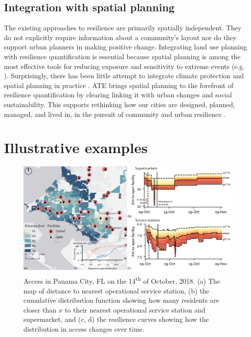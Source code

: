 \documentclass[9pt,twocolumn,twoside,lineno]{pnas-new}
\begin{document}
\subsection*{Integration with spatial planning}
The existing approaches to resilience are primarily spatially independent.
They do not explicitly require information about a community's layout nor do they support urban planners in making positive change. 
Integrating land use planning with resilience quantification is essential because spatial planning is among the most effective tools for reducing exposure and sensitivity to extreme events \cite{Brunetta2019-ki, Campbell2006-in, Hurlimann2012-uj} (e.g. \cite{Anderson2018-hr}). 
Surprisingly, there has been little attempt to integrate climate protection and spatial planning in practice \cite{Barnes2017-xf}.
ATE brings spatial planning to the forefront of resilience quantification by clearing linking it with urban changes and social sustainability.
This supports rethinking how our cities are designed, planned, managed, and lived in, in the pursuit of community and urban resilience \cite{Caldarice2019-tv}. 

\section*{Illustrative examples}
\begin{figure}
    \centering
    \includegraphics[width=\linewidth]{report/fig/FL_resilience.png}
    \caption{Access in Panama City, FL on the 14\textsuperscript{th} of October, 2018. (a) The map of distance to nearest operational service station, (b) the cumulative distribution function showing how many residents are closer than $x$ to their nearest operational service station and supermarket, and (c, d) the resilience curves showing how the distribution in access changes over time.
    }
    \label{fig:fig1}
\end{figure}
\end{document}
